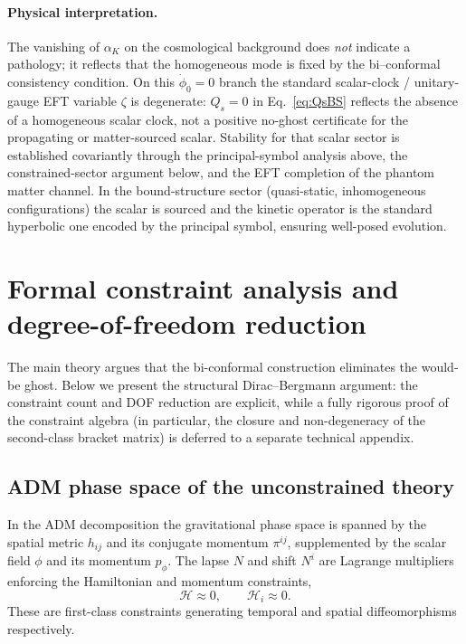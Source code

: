 \documentclass[11pt]{article}
\begin{document}
\paragraph{Physical interpretation.}
The vanishing of $\alpha_K$ on the cosmological background does \emph{not} indicate a pathology; it reflects that the homogeneous mode is fixed by the bi--conformal consistency condition. On this $\dot\phi_0=0$ branch the standard scalar-clock / unitary-gauge EFT variable $\zeta$ is degenerate: $Q_s=0$ in Eq.~\eqref{eq:QsBS} reflects the absence of a homogeneous scalar clock, not a positive no-ghost certificate for the propagating or matter-sourced scalar. Stability for that scalar sector is established covariantly through the principal-symbol analysis above, the constrained-sector argument below, and the EFT completion of the phantom matter channel. In the bound-structure sector (quasi-static, inhomogeneous configurations) the scalar is sourced and the kinetic operator is the standard hyperbolic one encoded by the principal symbol, ensuring well-posed evolution.

\section{Formal constraint analysis and degree-of-freedom reduction}\label{sec:constraint}

The main theory argues that the bi-conformal construction eliminates the would-be ghost.
Below we present the structural Dirac--Bergmann argument: the constraint count and DOF reduction are explicit, while a fully rigorous proof of the constraint algebra (in particular, the closure and non-degeneracy of the second-class bracket matrix) is deferred to a separate technical appendix.

\subsection{ADM phase space of the unconstrained theory}\label{sec:adm}

In the ADM decomposition the gravitational phase space is spanned by the spatial metric $h_{ij}$ and its conjugate momentum $\pi^{ij}$, supplemented by the scalar field $\phi$ and its momentum $p_\phi$.  The lapse $N$ and shift $N^i$ are Lagrange multipliers enforcing the Hamiltonian and momentum constraints,
\begin{equation}
\mathcal{H}\approx 0,\qquad \mathcal{H}_i\approx 0.
\label{eq:constraints_GR}
\end{equation}
These are first-class constraints generating temporal and spatial diffeomorphisms respectively.
\end{document}
